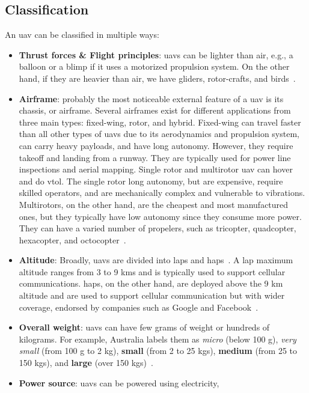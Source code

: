 \subsection{Classification}%
\label{sec:classification}
An \gls{uav} can be classified in multiple ways:
\begin{itemize}
\item \textbf{Thrust forces \& Flight principles}: \glspl{uav} can be lighter
  than air, e.g., a balloon or a blimp if it uses a motorized propulsion
  system. On the other hand, if they are heavier than air, we have
  gliders, rotor-crafts, and birds~\cite{mohsan2022towards}.
\item \textbf{Airframe}: probably the most noticeable external feature of a
  \gls{uav} is its chassis, or airframe. Several airframes exist for different
  applications from three main types: fixed-wing, rotor, and
  hybrid. Fixed-wing can travel faster than all other types of \glspl{uav} due
  to its aerodynamics and propulsion system, can carry heavy payloads, and have
  long autonomy. However, they require takeoff and landing from a runway. They
  are typically used for power line inspections and aerial mapping. Single rotor
  and multirotor \gls{uav} can hover and do \gls{vtol}. The single rotor long
  autonomy, but are expensive, require skilled operators, and are mechanically
  complex and vulnerable to vibrations. Multirotors, on the other hand, are the
  cheapest and most manufactured ones, but they typically have low autonomy
  since they consume more power. They can have a varied number of propelers,
  such as tricopter, quadcopter, hexacopter, and octocopter~\cite{mohsan2022towards}.
\item \textbf{Altitude}: Broadly, \glspl{uav} are divided into \glspl{lap} and
  \glspl{hap}~. A \gls{lap} maximum altitude ranges from 3 to 9 kms and is
  typically used to support cellular communications. \glspl{hap}, on the other
  hand, are deployed above the 9 km altitude and are used to support cellular
  communication but with wider coverage, endorsed by companies such as Google
  and Facebook~\cite{mohsan2022towards}.
%  
\item \textbf{Overall weight}: \glspl{uav} can have few grams of weight or
  hundreds of kilograms. For example, Australia labels them as \emph{micro}
  (below 100 g),
  \emph{very small} (from 100 g to 2 kg), \textbf{small} (from 2 to 25 kgs),
  \textbf{medium} (from 25 to 150 kgs), and \textbf{large} (over
  150 kgs)~\cite{alladi2022UAVBlockain}.
%  
\item \textbf{Power source}: \glspl{uav} can be powered using electricity,

\end{itemize}
